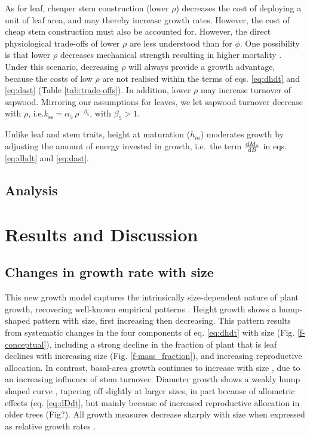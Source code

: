 \documentclass[a4paper,11pt]{article}
\begin{document}
As for leaf, cheaper stem construction (lower $\rho$) decreases the
cost of deploying a unit of leaf area, and may thereby increase growth
rates. However, the cost of cheap stem construction must also be
accounted for. However, the direct physiological trade-offs of lower
$\rho$ are less understood than for $\phi$. One possibility is that
lower $\rho$ decreases mechanical strength resulting in higher
mortality \citep{Chave-2009, Wright-2010}. Under
this scenario, decreasing $\rho$ will always provide a growth
advantage, because the costs of low $\rho$ are not realised within the
terms of eqs. \ref{eq:dhdt} and \ref{eq:dast} (Table
\ref{tab:trade-offs}). In addition, lower $\rho$ may increase turnover
of sapwood. Mirroring our assumptions for leaves, we let sapwood
turnover decrease with $\rho$,
i.e.$k_\textrm{ss}=\alpha_5 \, \rho^{-\beta_5}$, with $\beta_5 > 1$.

Unlike leaf and stem traits, height at maturation ($h_m$) moderates
growth by adjusting the amount of energy invested in growth, i.e.~the
term $\frac{{\rm d}M_{\rm a}}{{\rm d}B}$ in eqs.
\ref{eq:dhdt} and \ref{eq:dast}.

\subsection{Analysis}\label{analysis}



\newpage
\section{Results and Discussion}\label{results}

\subsection{Changes in growth rate with size}

This new growth model captures the intrinsically size-dependent nature
of plant growth, recovering well-known
empirical patterns \citep{Sillett-2010, King-2011}. Height growth shows a hump-shaped pattern
with size, first increasing then decreasing. This pattern results from
systematic changes in the four components of eq. \ref{eq:dhdt} with size
(Fig. \ref{f-conceptual}), including a strong decline in the fraction of plant
that is leaf declines with increasing size (Fig. \ref{f-mass_fraction}),
and increasing reproductive allocation. In contrast, basal-area growth
continues to increase with size \citep{Sillett-2010, Stephenson-2014},
due to an increasing influence of stem
turnover. Diameter growth shows a weakly hump shaped
curve \citep{Herault-2011}, tapering off slightly at larger
sizes, in part because of allometric effects (eq. \ref{eq:dDdt}, but
mainly because of increased reproductive allocation in older trees
(Fig?). All growth measures decrease sharply with size when expressed as
relative growth rates \citep{Iida-2014}.
\end{document}
